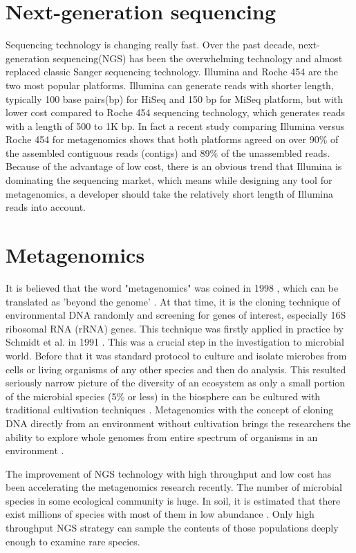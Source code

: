 \section{Next-generation sequencing}
Sequencing technology is changing really fast. Over the past decade, next-generation sequencing(NGS)
 has been the overwhelming technology and almost replaced classic Sanger sequencing technology. 
 Illumina and Roche 454 are the two most popular platforms. Illumina can generate reads with shorter
 length, typically 100 base pairs(bp) for HiSeq and 150 bp for MiSeq platform\cite{Qin:2010aa, Mason:2012aa},   
 but with lower cost compared to Roche 454 sequencing technology, 
 which generates reads with a length of 500 to 1K bp. In fact a recent study comparing Illumina versus Roche 454 for metagenomics
 shows that both platforms agreed on over 90\% of the assembled contiguous reads (contigs) and 89\% of the unassembled reads\cite{Luo:2012aa}.
Because of the advantage of low cost, there is an obvious trend that Illumina is dominating the sequencing market, which 
means while designing any tool for metagenomics, a developer should take the relatively short length of Illumina reads
 into account.


\section{Metagenomics}
It is believed that the word "metagenomics" was coined in 1998 \cite{Handelsman:1998aa},
 which can be translated as 'beyond the genome' \cite{Gilbert:2011aa}. At that time, 
 it is the cloning technique of environmental DNA randomly and screening for genes of interest, 
 especially 16S ribosomal RNA (rRNA) genes. This technique was firstly applied in practice by Schmidt et al. in 1991 \cite{Schmidt:1991aa}.
 This was a crucial step in the investigation to microbial world. Before that it was standard 
 protocol to culture and isolate microbes from cells or living organisms of any other species and 
 then do analysis. This resulted seriously narrow picture of the diversity of an ecosystem as only a
 small portion of the microbial species (5\% or less) in the biosphere can be cultured with traditional cultivation techniques \cite{Sogin:2006aa}.
 Metagenomics with the concept of cloning DNA directly from an environment without cultivation 
 brings the researchers the ability to explore whole genomes from entire spectrum of organisms in an environment
.
 
The improvement of NGS technology with high throughput and low cost has been accelerating
the metagenomics research recently. The number of microbial species in some ecological community is huge. 
In soil, it is estimated that there exist millions of species with most of them in low abundance \cite{Gans:2005aa}. 
Only high throughput NGS strategy can sample the contents of those populations deeply enough
to examine rare species.

